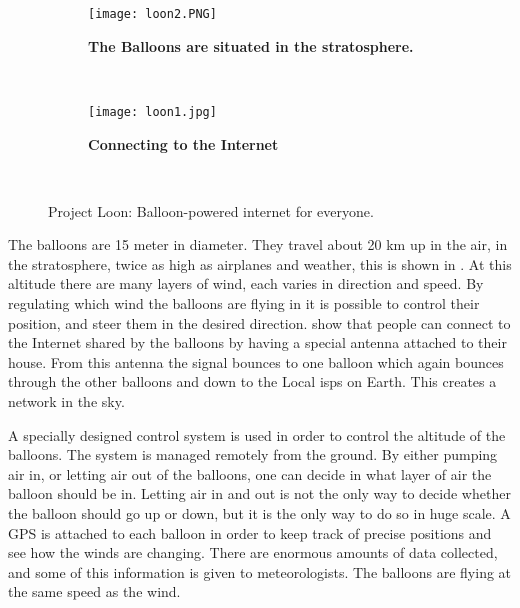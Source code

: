 \begin{figure}
        \centering
        \begin{subfigure}[t]{0.43\textwidth}
                \texttt{[image: loon2.PNG]}
                \caption[The Balloons are situated in the stratosphere]{\textbf{The Balloons are situated in the stratosphere.}} 
                \label{fig:loonStratosphere}
        \end{subfigure}%
        ~ %
        \begin{subfigure}[t]{0.415\textwidth}
                \texttt{[image: loon1.jpg]}
               \caption[Connecting to the Internet]							{\textbf{Connecting to the Internet}} 
                \label{fig:loonConnect}
        \end{subfigure}
        ~ %
        \caption{Project Loon: Balloon-powered internet for everyone.}\label{fig:loon}
\end{figure}



The balloons are 15 meter in diameter. They travel about 20 km up in the air, in the stratosphere, twice as high as airplanes and weather, this is shown in . At this altitude there are many layers of wind, each varies in direction and speed. By regulating which wind the balloons are flying in it is possible to control their position, and steer them in the desired direction.  show that people can connect to the Internet shared by the balloons by having a special antenna attached to their house. From this antenna the signal bounces to one balloon which again bounces through the other balloons and down to the Local \glspl{isp} on Earth. This creates a network in the sky. 

A specially designed control system is used in order to control the altitude of the balloons. The system is managed remotely from the ground. By either pumping air in, or letting air out of the balloons, one can decide in what layer of air the balloon should be in. Letting air in and out is not the only way to decide whether the balloon should go up or down, but it is the only way to do so in huge scale. A GPS is attached to each balloon in order to keep track of precise positions and see how the winds are changing. There are enormous amounts of data collected, and some of this information is given to meteorologists. The balloons are flying at the same speed as the wind.  

